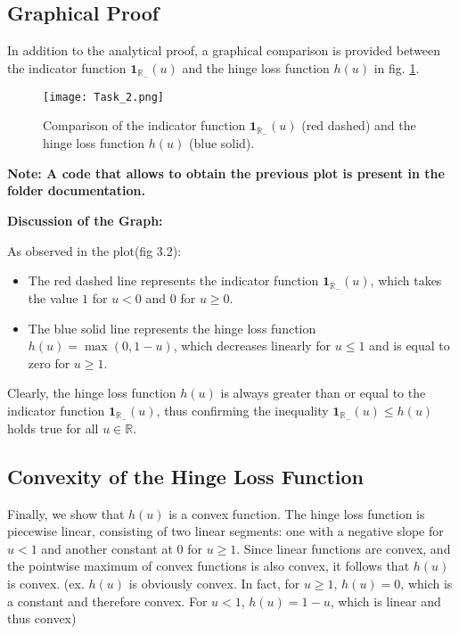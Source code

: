 \documentclass[a4paper,12pt]{report}
\begin{document}
\subsection{Graphical Proof}

In addition to the analytical proof, a graphical comparison is provided between the indicator function $\mathbf{1}_{\mathbb{R}_-}(u)$ and the hinge loss function $h(u)$ in fig. \ref{task_2}. 

\begin{figure}[h!]
    \centering
    \texttt{[image: Task\_2.png]}
    \caption{Comparison of the indicator function $\mathbf{1}_{\mathbb{R}_-}(u)$ (red dashed) and the hinge loss function $h(u)$ (blue solid).}
    \label{task_2}
\end{figure}
\vspace{0.3cm}
\textbf{Note: A code that allows to obtain the previous plot is present in the folder documentation.}

\vspace{0.5cm}
{\large\textbf{Discussion of the Graph:}}
\vspace{0.3cm}

As observed in the plot(fig 3.2):
\begin{itemize}
    \item The red dashed line represents the indicator function $\mathbf{1}_{\mathbb{R}_-}(u)$, which takes the value $1$ for $u < 0$ and $0$ for $u \geq 0$.
    \item The blue solid line represents the hinge loss function $h(u) = \max(0, 1 - u)$, which decreases linearly for $u \leq 1$ and is equal to zero for $u \geq 1$.
\end{itemize}

Clearly, the hinge loss function $h(u)$ is always greater than or equal to the indicator function $\mathbf{1}_{\mathbb{R}_-}(u)$, thus confirming the inequality $\mathbf{1}_{\mathbb{R}_-}(u) \leq h(u)$ holds true for all $u \in \mathbb{R}$.

\subsection{Convexity of the Hinge Loss Function}

Finally, we show that $h(u)$ is a convex function. The hinge loss function is piecewise linear, consisting of two linear segments: one with a negative slope for $u < 1$ and another constant at $0$ for $u \geq 1$. Since linear functions are convex, and the pointwise maximum of convex functions is also convex, it follows that $h(u)$ is convex. (ex. $h(u)$ is obviously convex. In fact, for $u \geq 1$, $h(u) = 0$, which is a constant and therefore convex. For $u < 1$, $h(u) = 1 - u$, which is linear and thus convex)
\end{document}
